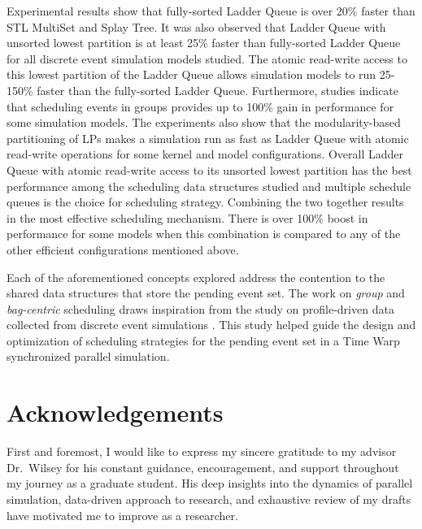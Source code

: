 \documentclass[11pt]{book}
\begin{document}
Experimental results show that fully-sorted Ladder Queue is over 20\% faster than STL MultiSet and Splay Tree.
It was also observed that Ladder Queue with unsorted lowest partition is at least 25\% faster than
fully-sorted Ladder Queue for all discrete event simulation models studied.  The atomic read-write access to
this lowest partition of the Ladder Queue allows simulation models to run 25-150\% faster than the
fully-sorted Ladder Queue.  Furthermore, studies indicate that scheduling events in groups provides up to
100\% gain in performance for some simulation models.  The experiments also show that the modularity-based
partitioning of LPs makes a simulation run as fast as Ladder Queue with atomic read-write operations for some
kernel and model configurations. Overall Ladder Queue with atomic read-write access to its unsorted lowest
partition has the best performance among the scheduling data structures studied and multiple schedule queues
is the choice for scheduling strategy. Combining the two together results in the most effective scheduling
mechanism. There is over 100\% boost in performance for some models when this combination is compared to any
of the other efficient configurations mentioned above.

Each of the aforementioned concepts explored address the contention to the shared data structures that store
the pending event set.  The work on \emph{group} and \emph{bag-centric} scheduling draws inspiration from the
study on profile-driven data collected from discrete event simulations \cite{wilsey-16}.  This study helped
guide the design and optimization of scheduling strategies for the pending event set in a Time Warp
synchronized parallel simulation.

\clearpage
\thispagestyle{empty}
\hfill
\clearpage

\clearpage
\chapter*{Acknowledgements}

First and foremost, I would like to express my sincere gratitude to my advisor Dr.\ Wilsey for his constant
guidance, encouragement, and support throughout my journey as a graduate student.  His deep insights into
the dynamics of parallel simulation, data-driven approach to research, and exhaustive review of my drafts
have motivated me to improve as a researcher.
\end{document}
